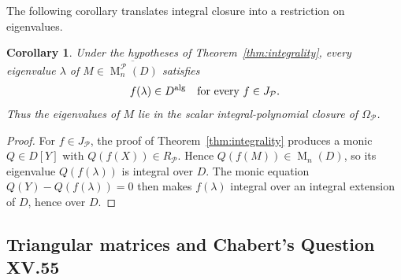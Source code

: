\documentclass[11pt]{amsart}
\newtheorem{corollary}[theorem]{Corollary}
\theoremstyle{definition}
\theoremstyle{remark}
\newcommand{\Mat}{\operatorname{M}}
\begin{document}
The following corollary translates integral closure into a restriction on eigenvalues.
\begin{corollary}\label{cor:spectral}
Under the hypotheses of Theorem~\ref{thm:integrality}, every eigenvalue
$\lambda$ of $M\in\overline{\Mat_n^{\mathcal P}(D)}$ satisfies
\[
f(\lambda)\in D^{\rm alg}\quad\text{for every }f\in J_{\mathcal P}.
\]
Thus the eigenvalues of $M$ lie in the scalar integral-polynomial
closure of $\Omega_{\mathcal P}$.
\end{corollary}
\begin{proof}
For $f\in J_{\mathcal P}$, the proof of Theorem~\ref{thm:integrality}
produces a monic $Q\in D[Y]$ with $Q(f(X))\in R_{\mathcal P}$.
Hence $Q(f(M))\in\Mat_n(D)$, so its eigenvalue
$Q(f(\lambda))$ is integral over $D$.
The monic equation $Q(Y)-Q(f(\lambda))=0$ then makes $f(\lambda)$
integral over an integral extension of $D$, hence over $D$.
\end{proof}

\subsection{Triangular matrices and Chabert's Question XV.55}
\end{document}
